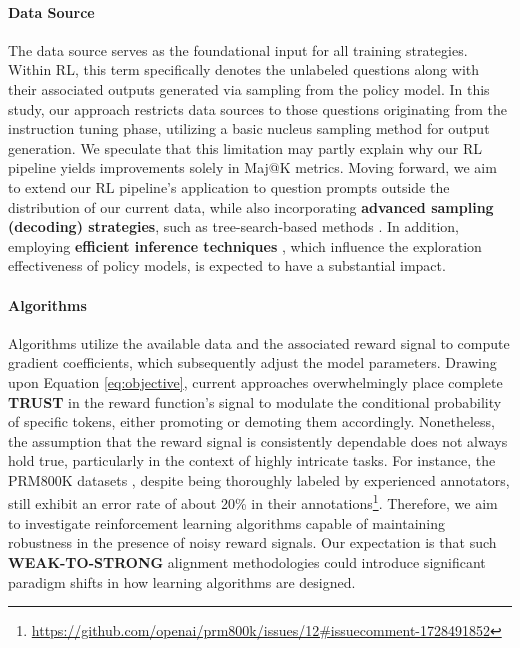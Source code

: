 \begin{itemize}[topsep=0pt]
\begin{itemize}[topsep=0pt]
\paragraph{Data Source} The data source serves as the foundational input for all training strategies. Within RL, this term specifically denotes the unlabeled questions along with their associated outputs generated via sampling from the policy model. In this study, our approach restricts data sources to those questions originating from the instruction tuning phase, utilizing a basic nucleus sampling method for output generation. We speculate that this limitation may partly explain why our RL pipeline yields improvements solely in Maj@K metrics. Moving forward, we aim to extend our RL pipeline's application to question prompts outside the distribution of our current data, while also incorporating \textbf{advanced sampling (decoding) strategies}, such as tree-search-based methods \citep{yao2023tree}. In addition, employing \textbf{efficient inference techniques} \citep{xia-etal-2023-speculative,leviathan2023fast,kwon2023efficient,xia2024unlocking}, which influence the exploration effectiveness of policy models, is expected to have a substantial impact.

\paragraph{Algorithms} Algorithms utilize the available data and the associated reward signal to compute gradient coefficients, which subsequently adjust the model parameters. Drawing upon Equation \ref{eq:objective}, current approaches overwhelmingly place complete \textbf{TRUST} in the reward function's signal to modulate the conditional probability of specific tokens, either promoting or demoting them accordingly. Nonetheless, the assumption that the reward signal is consistently dependable does not always hold true, particularly in the context of highly intricate tasks. For instance, the PRM800K datasets \citep{lightman2023let}, despite being thoroughly labeled by experienced annotators, still exhibit an error rate of about 20\% in their annotations\footnote{\url{https://github.com/openai/prm800k/issues/12\#issuecomment-1728491852}}. Therefore, we aim to investigate reinforcement learning algorithms capable of maintaining robustness in the presence of noisy reward signals. Our expectation is that such \textbf{WEAK-TO-STRONG} \citep{burns2023weak} alignment methodologies could introduce significant paradigm shifts in how learning algorithms are designed.


\end{itemize}
\end{itemize}
